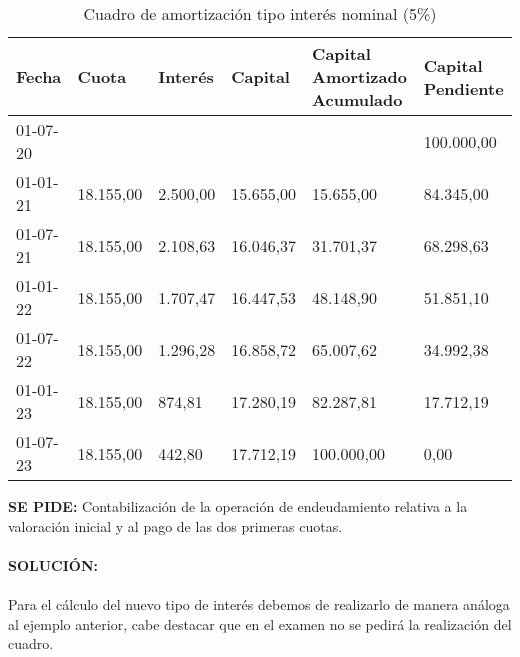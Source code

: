 \begin{table}[h]
    \centering
    \begin{tabular}{p{2cm}p{2cm}p{2cm}p{2cm}p{2cm}p{2cm}}
        \toprule
        \textbf{Fecha} & \textbf{Cuota} & \textbf{Interés} & \textbf{Capital} & \textbf{Capital Amortizado Acumulado} & \textbf{Capital Pendiente} \\
        \midrule
        01-07-20 & & & & & 100.000,00 \\
        01-01-21 & 18.155,00 & 2.500,00 & 15.655,00 & 15.655,00 & 84.345,00 \\
        01-07-21 & 18.155,00 & 2.108,63 & 16.046,37 & 31.701,37 & 68.298,63 \\
        01-01-22 & 18.155,00 & 1.707,47 & 16.447,53 & 48.148,90 & 51.851,10 \\
        01-07-22 & 18.155,00 & 1.296,28 & 16.858,72 & 65.007,62 & 34.992,38 \\
        01-01-23 & 18.155,00 & 874,81 & 17.280,19 & 82.287,81 & 17.712,19 \\
        01-07-23 & 18.155,00 & 442,80 & 17.712,19 & 100.000,00 & 0,00 \\
        \bottomrule
    \end{tabular}
    \caption{Cuadro de amortización tipo interés nominal (5\%)}
    \label{tab:amortizacion}
\end{table}

\textbf{SE PIDE:} Contabilización de la operación de endeudamiento relativa a la valoración inicial y al pago de las dos primeras cuotas.
\\\\
\textbf{SOLUCIÓN:} \\\\

Para el cálculo del nuevo tipo de interés debemos de realizarlo de manera análoga al ejemplo anterior, cabe destacar que en el examen no se pedirá la realización del cuadro.


